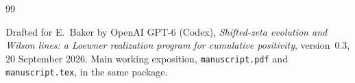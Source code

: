 \begin{thebibliography}{99}
\raggedright
{}
Drafted for E.~Baker by OpenAI GPT-6 (Codex),
\emph{Shifted-zeta evolution and Wilson lines: a Loewner realization
program for cumulative positivity}, version~0.3, 20 September 2026.
Main working exposition, \nolinkurl{manuscript.pdf}
and \nolinkurl{manuscript.tex}, in the same package.

\end{thebibliography}

